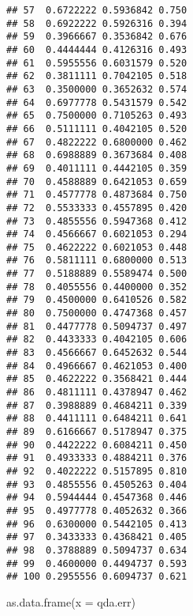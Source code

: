 \documentclass[
]{article}
\newenvironment{Shaded}{\begin{snugshade}}{\end{snugshade}}
\newcommand{\AttributeTok}[1]{\textcolor[rgb]{0.77,0.63,0.00}{#1}}
\newcommand{\FunctionTok}[1]{\textcolor[rgb]{0.00,0.00,0.00}{#1}}
\newcommand{\NormalTok}[1]{#1}
\begin{document}
\begin{verbatim}
## 57  0.6722222 0.5936842 0.750
## 58  0.6922222 0.5926316 0.394
## 59  0.3966667 0.3536842 0.676
## 60  0.4444444 0.4126316 0.493
## 61  0.5955556 0.6031579 0.520
## 62  0.3811111 0.7042105 0.518
## 63  0.3500000 0.3652632 0.574
## 64  0.6977778 0.5431579 0.542
## 65  0.7500000 0.7105263 0.493
## 66  0.5111111 0.4042105 0.520
## 67  0.4822222 0.6800000 0.462
## 68  0.6988889 0.3673684 0.408
## 69  0.4011111 0.4442105 0.359
## 70  0.4588889 0.6421053 0.659
## 71  0.4577778 0.4873684 0.750
## 72  0.5533333 0.4557895 0.420
## 73  0.4855556 0.5947368 0.412
## 74  0.4566667 0.6021053 0.294
## 75  0.4622222 0.6021053 0.448
## 76  0.5811111 0.6800000 0.513
## 77  0.5188889 0.5589474 0.500
## 78  0.4055556 0.4400000 0.352
## 79  0.4500000 0.6410526 0.582
## 80  0.7500000 0.4747368 0.457
## 81  0.4477778 0.5094737 0.497
## 82  0.4433333 0.4042105 0.606
## 83  0.4566667 0.6452632 0.544
## 84  0.4966667 0.4621053 0.400
## 85  0.4622222 0.3568421 0.444
## 86  0.4811111 0.4378947 0.462
## 87  0.3988889 0.4684211 0.339
## 88  0.4411111 0.6484211 0.641
## 89  0.6166667 0.5178947 0.375
## 90  0.4422222 0.6084211 0.450
## 91  0.4933333 0.4884211 0.376
## 92  0.4022222 0.5157895 0.810
## 93  0.4855556 0.4505263 0.404
## 94  0.5944444 0.4547368 0.446
## 95  0.4977778 0.4052632 0.366
## 96  0.6300000 0.5442105 0.413
## 97  0.3433333 0.4368421 0.405
## 98  0.3788889 0.5094737 0.634
## 99  0.4600000 0.4494737 0.593
## 100 0.2955556 0.6094737 0.621
\end{verbatim}

\begin{Shaded}
\begin{Highlighting}[]
\FunctionTok{as.data.frame}\NormalTok{(}\AttributeTok{x =}\NormalTok{ qda.err)}
\end{Highlighting}
\end{Shaded}
\end{document}
